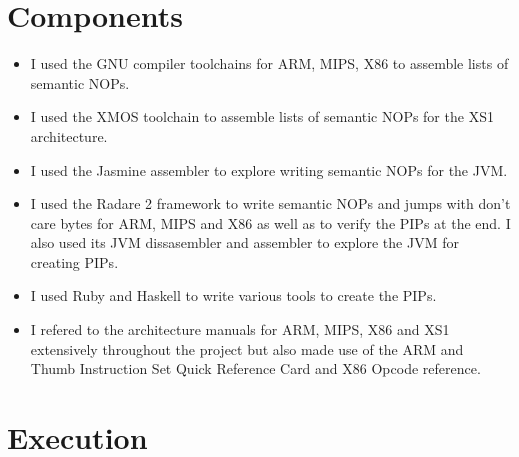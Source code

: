 \documentclass[]{book}
\begin{document}
\chapter{Components}

\begin{itemize}
\item
  I used the GNU compiler toolchains for ARM, MIPS, X86 to assemble
  lists of semantic NOPs.
\item
  I used the XMOS toolchain to assemble lists of semantic NOPs for the
  XS1 architecture.
\item
  I used the Jasmine assembler to explore writing semantic NOPs for the
  JVM.
\item
  I used the Radare 2 framework to write semantic NOPs and jumps with
  don't care bytes for ARM, MIPS and X86 as well as to verify the PIPs
  at the end. I also used its JVM dissasembler and assembler to explore
  the JVM for creating PIPs.
\item
  I used Ruby and Haskell to write various tools to create the PIPs.
\item
  I refered to the architecture manuals for ARM,
  MIPS\autocite{MIPSTechnologiesInc:2011ta}, X86 and XS1 extensively
  throughout the project but also made use of the ARM and Thumb
  Instruction Set Quick Reference Card\autocite{Limited:vc} and X86
  Opcode reference\autocite{refx86}.
\end{itemize}
\chapter{Execution}

\printbibliography[title=Conclusion]
\end{document}
